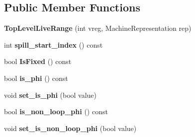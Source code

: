 \subsection*{Public Member Functions}
\begin{DoxyCompactItemize}
\item 
{\bfseries Top\+Level\+Live\+Range} (int vreg, Machine\+Representation rep)\hypertarget{classv8_1_1internal_1_1compiler_1_1_top_level_live_range_a6c74e403124fe51fef5636c52a029605}{}\label{classv8_1_1internal_1_1compiler_1_1_top_level_live_range_a6c74e403124fe51fef5636c52a029605}

\item 
int {\bfseries spill\+\_\+start\+\_\+index} () const \hypertarget{classv8_1_1internal_1_1compiler_1_1_top_level_live_range_a1f7ee55fc73cf527123d162e30fc0064}{}\label{classv8_1_1internal_1_1compiler_1_1_top_level_live_range_a1f7ee55fc73cf527123d162e30fc0064}

\item 
bool {\bfseries Is\+Fixed} () const \hypertarget{classv8_1_1internal_1_1compiler_1_1_top_level_live_range_af83175ea412b772cbc9b6b2ee903e468}{}\label{classv8_1_1internal_1_1compiler_1_1_top_level_live_range_af83175ea412b772cbc9b6b2ee903e468}

\item 
bool {\bfseries is\+\_\+phi} () const \hypertarget{classv8_1_1internal_1_1compiler_1_1_top_level_live_range_ae2cc09db0ac62e3eb65ad39f1dc2a87d}{}\label{classv8_1_1internal_1_1compiler_1_1_top_level_live_range_ae2cc09db0ac62e3eb65ad39f1dc2a87d}

\item 
void {\bfseries set\+\_\+is\+\_\+phi} (bool value)\hypertarget{classv8_1_1internal_1_1compiler_1_1_top_level_live_range_a3586500c1cbdd083f93948478963e537}{}\label{classv8_1_1internal_1_1compiler_1_1_top_level_live_range_a3586500c1cbdd083f93948478963e537}

\item 
bool {\bfseries is\+\_\+non\+\_\+loop\+\_\+phi} () const \hypertarget{classv8_1_1internal_1_1compiler_1_1_top_level_live_range_ad41b8b1b775b238396ca3b6bdb023f2f}{}\label{classv8_1_1internal_1_1compiler_1_1_top_level_live_range_ad41b8b1b775b238396ca3b6bdb023f2f}

\item 
void {\bfseries set\+\_\+is\+\_\+non\+\_\+loop\+\_\+phi} (bool value)\hypertarget{classv8_1_1internal_1_1compiler_1_1_top_level_live_range_a2a2460a3817ed77756ed48d5de31b310}{}\label{classv8_1_1internal_1_1compiler_1_1_top_level_live_range_a2a2460a3817ed77756ed48d5de31b310}


\end{DoxyCompactItemize}
